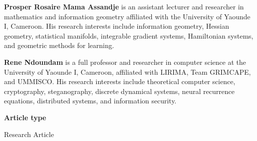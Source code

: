 \documentclass[11pt,a4paper]{article}
\begin{document}
\textbf{Prosper Rosaire Mama Assandje} is an assistant lecturer and researcher
in mathematics and information geometry affiliated with the University of
Yaounde I, Cameroon. His research interests include information geometry,
Hessian geometry, statistical manifolds, integrable gradient systems,
Hamiltonian systems, and geometric methods for learning.

\textbf{Rene Ndoundam} is a full professor and researcher in computer science
at the University of Yaounde I, Cameroon, affiliated with LIRIMA, Team
GRIMCAPE, and UMMISCO. His research interests include theoretical computer
science, cryptography, steganography, discrete dynamical systems, neural
recurrence equations, distributed systems, and information security.

\vspace{1em}
\textbf{Article type}

Research Article
\end{document}
